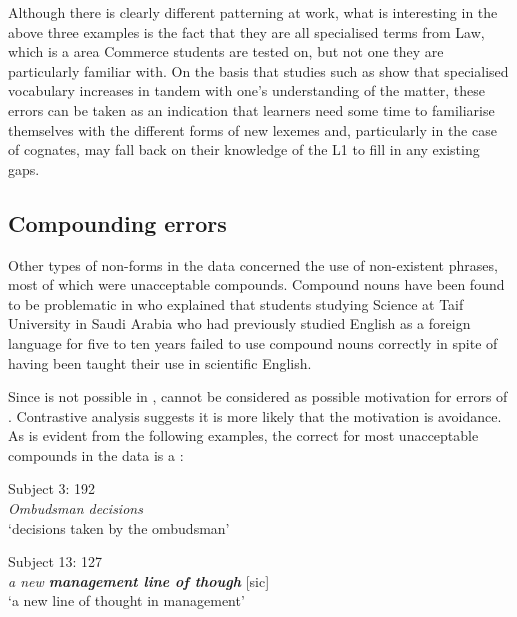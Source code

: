 \documentclass[output=paper]{langsci/langscibook}
\begin{document}
Although there is clearly different patterning at work, what is
interesting in the above three examples is the fact that they are all
specialised terms from Law, which is a  area Commerce students
are tested on, but not one they are particularly familiar with. On the
basis that studies such as \citet{Nation1993} show that specialised
vocabulary increases in tandem with one’s understanding of the 
matter, these errors can be taken as an indication that learners need
some time to familiarise themselves with the different forms of new
lexemes and, particularly in the case of cognates, may fall back on
their knowledge of the L1 to fill in any existing gaps.


\subsection{Compounding errors}
\label{sec:key:4.2}
Other types of non-forms in the data concerned the use of non-existent
phrases, most of which were unacceptable  compounds. Compound
nouns have been found to be problematic in
\citet{AlaminAhmed2012} who explained that students studying Science at Taif
University in Saudi Arabia who had previously studied English as a
foreign language for five to ten years failed to use compound nouns
correctly in spite of having been taught their use in scientific
English.

Since  is not possible in ,  cannot
be considered as possible motivation for errors of
. Contrastive analysis suggests it is more likely that the
motivation is avoidance. As is evident from the following examples,
the correct  for most unacceptable  compounds in the
data is a  :


\begin{exe}  
  \ex{}
  {Subject 3: 192}\\
    \textit{Ombudsman decisions}\\
    {‘decisions taken by the ombudsman’}
  \label{ex11}
\end{exe}

\begin{exe}  
  \ex{}
  {Subject 13: 127}\\
    \textit{a new \textbf{management line of though}} [sic]\\
    {‘a new line of thought in management’}
  \label{ex12}
\end{exe}
\end{document}
